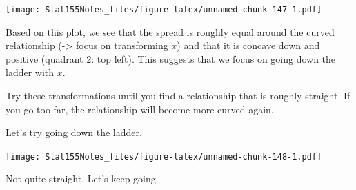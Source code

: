 \documentclass[]{book}
\newenvironment{Shaded}{\begin{snugshade}}{\end{snugshade}}
\newcommand{\CommentTok}[1]{\textcolor[rgb]{0.56,0.35,0.01}{\textit{#1}}}
\newcommand{\DataTypeTok}[1]{\textcolor[rgb]{0.13,0.29,0.53}{#1}}
\newcommand{\DecValTok}[1]{\textcolor[rgb]{0.00,0.00,0.81}{#1}}
\newcommand{\KeywordTok}[1]{\textcolor[rgb]{0.13,0.29,0.53}{\textbf{#1}}}
\newcommand{\NormalTok}[1]{#1}
\newcommand{\OperatorTok}[1]{\textcolor[rgb]{0.81,0.36,0.00}{\textbf{#1}}}
\newcommand{\StringTok}[1]{\textcolor[rgb]{0.31,0.60,0.02}{#1}}
\begin{document}
\texttt{[image: Stat155Notes\_files/figure-latex/unnamed-chunk-147-1.pdf]}

Based on this plot, we see that the spread is roughly equal around the curved relationship (-\textgreater{} focus on transforming \(x\)) and that it is concave down and positive (quadrant 2: top left). This suggests that we focus on going down the ladder with \(x\).

Try these transformations until you find a relationship that is roughly straight. If you go too far, the relationship will become more curved again.

Let's try going down the ladder.

\begin{Shaded}
\end{Shaded}

\texttt{[image: Stat155Notes\_files/figure-latex/unnamed-chunk-148-1.pdf]}

Not quite straight. Let's keep going.

\begin{Shaded}
\end{Shaded}
\end{document}
